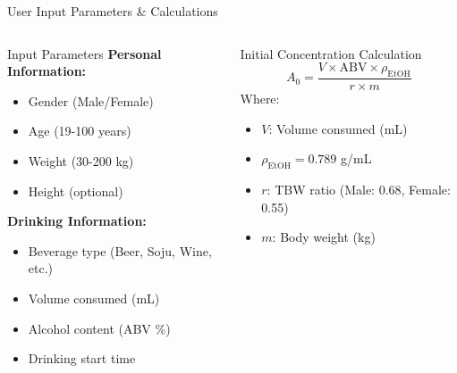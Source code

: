 \documentclass[aspectratio=169]{beamer}
\begin{document}
\begin{frame}{User Input Parameters \& Calculations}
    \begin{columns}
        \begin{column}{0.5\textwidth}
            \begin{block}{Input Parameters}
                \textbf{Personal Information:}
                \begin{itemize}
                    \item Gender (Male/Female)
                    \item Age (19-100 years)
                    \item Weight (30-200 kg)
                    \item Height (optional)
                \end{itemize}
                
                \textbf{Drinking Information:}
                \begin{itemize}
                    \item Beverage type (Beer, Soju, Wine, etc.)
                    \item Volume consumed (mL)
                    \item Alcohol content (ABV \%)
                    \item Drinking start time
                \end{itemize}
            \end{block}
        \end{column}
        
        \begin{column}{0.5\textwidth}
            \begin{block}{Initial Concentration Calculation}
                \[
                A_0 = \frac{V \times \text{ABV} \times \rho_{\text{EtOH}}}{r \times m}
                \]
                Where:
                \begin{itemize}
                    \item $V$: Volume consumed (mL)
                    \item $\rho_{\text{EtOH}} = 0.789$ g/mL
                    \item $r$: TBW ratio (Male: 0.68, Female: 0.55)
                    \item $m$: Body weight (kg)
                \end{itemize}
            \end{block}
            

\end{column}
\end{columns}
\end{frame}
\end{document}

